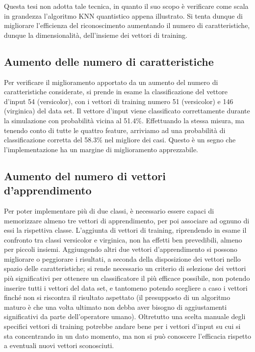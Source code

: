 Questa tesi non adotta tale tecnica, in quanto il suo scopo è verificare come scala in grandezza 
l'algoritmo \ac{KNN} quantistico appena illustrato. Si tenta dunque di migliorare l'efficienza 
del riconoscimento aumentando il numero di caratteristiche, dunque la dimensionalità, dell'insieme 
dei vettori di training. 

\subsection{Aumento delle numero di caratteristiche}

Per verificare il miglioramento apportato da un aumento del numero di caratteristiche 
considerate, si prende in esame la classificazione del vettore d'input 54 (versicolor), 
con i vettori di training numero 51 (versicolor) e 146 (virginica) del data set. 
Il vettore d'input viene classificato correttamente durante la simulazione 
con probabilità vicina al 51.4\%. 
Effettuando la stessa misura, ma tenendo conto di tutte le quattro feature, arriviamo ad 
una probabilità di classificazione corretta del 58.3\% nel migliore dei casi. Questo è un 
segno che l'implementazione ha un margine di miglioramento apprezzabile. 

\subsection{Aumento del numero di vettori d'apprendimento}

Per poter implementare più di due classi, è necessario essere capaci di 
memorizzare almeno tre vettori di apprendimento, per poi associare ad ognuno di essi la 
rispettiva classe. 
L'aggiunta di vettori di training, riprendendo in esame il confronto tra classi 
versicolor e virginica, non ha effetti ben prevedibili, almeno per piccoli 
insiemi. Aggiungendo altri due vettori d'apprendimento si possono migliorare o 
peggiorare i risultati, a seconda della disposizione dei vettori nello spazio delle 
caratteristiche; si rende necessario un criterio di selezione dei vettori più 
significativi per ottenere un classificatore il più efficace possibile, 
non potendo inserire tutti i vettori del data set, 
e tantomeno potendo scegliere a caso i vettori finché non si 
riscontra il risultato aspettato (il presupposto di un algoritmo maturo è che 
una volta ultimato non debba aver bisogno di aggiustamenti significativi da 
parte dell'operatore umano). Oltretutto una scelta manuale degli specifici vettori 
di training potrebbe andare bene per i vettori d'input su cui si sta concentrando 
in un dato momento, ma non si può conoscere l'efficacia rispetto a eventuali 
nuovi vettori sconosciuti. 

